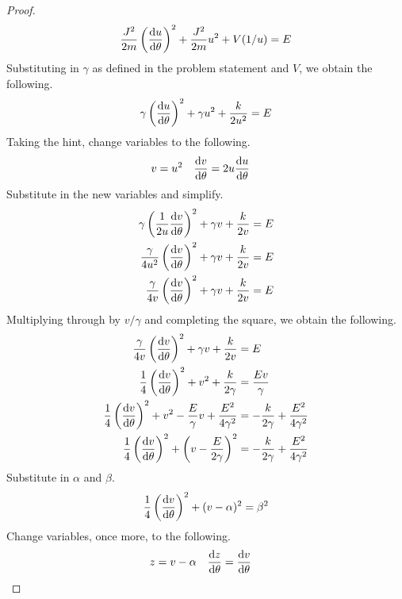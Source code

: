\documentclass[../psets.tex]{subfiles}
\begin{document}
\begin{enumerate}
\begin{enumerate}
\begin{proof}
\begin{equation*}
                \frac{J^2}{2m}\left( \dv{u}{\theta} \right)^2+\frac{J^2}{2m}u^2+V(1/u) = E
            \end{equation*}
            Substituting in $\gamma$ as defined in the problem statement and $V$, we obtain the following.
            \begin{equation*}
                \gamma\left( \dv{u}{\theta} \right)^2+\gamma u^2+\frac{k}{2u^2} = E
            \end{equation*}
            Taking the hint, change variables to the following.
            \begin{align*}
                v &= u^2&
                \dv{v}{\theta} &= 2u\dv{u}{\theta}
            \end{align*}
            Substitute in the new variables and simplify.
            \begin{align*}
                \gamma\left( \frac{1}{2u}\dv{v}{\theta} \right)^2+\gamma v+\frac{k}{2v} &= E\\
                \frac{\gamma}{4u^2}\left( \dv{v}{\theta} \right)^2+\gamma v+\frac{k}{2v} &= E\\
                \frac{\gamma}{4v}\left( \dv{v}{\theta} \right)^2+\gamma v+\frac{k}{2v} &= E
            \end{align*}
            Multiplying through by $v/\gamma$ and completing the square, we obtain the following.
            \begin{align*}
                \frac{\gamma}{4v}\left( \dv{v}{\theta} \right)^2+\gamma v+\frac{k}{2v} &= E\\
                \frac{1}{4}\left( \dv{v}{\theta} \right)^2+v^2+\frac{k}{2\gamma} &= \frac{Ev}{\gamma}\\
                \frac{1}{4}\left( \dv{v}{\theta} \right)^2+v^2-\frac{E}{\gamma}v+\frac{E^2}{4\gamma^2} &= -\frac{k}{2\gamma}+\frac{E^2}{4\gamma^2}\\
                \frac{1}{4}\left( \dv{v}{\theta} \right)^2+\left( v-\frac{E}{2\gamma} \right)^2 &= -\frac{k}{2\gamma}+\frac{E^2}{4\gamma^2}
            \end{align*}
            Substitute in $\alpha$ and $\beta$.
            \begin{equation*}
                \frac{1}{4}\left( \dv{v}{\theta} \right)^2+(v-\alpha)^2 = \beta^2
            \end{equation*}
            Change variables, once more, to the following.
            \begin{align*}
                z &= v-\alpha&
                \dv{z}{\theta} &= \dv{v}{\theta}

\end{align*}
\end{proof}
\end{enumerate}
\end{enumerate}
\end{document}
